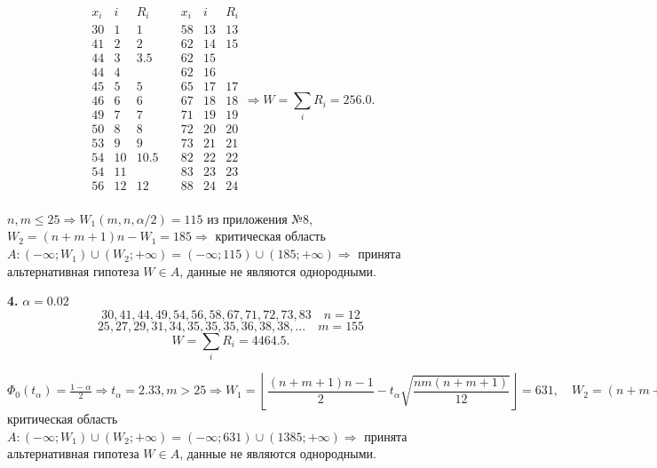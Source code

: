 \documentclass[9pt]{article}
\begin{document}
\[\begin{array}{c|c|c}
    x_i & i & R_i \\ \hline
    30 & 1 & 1\\
    41 & 2 & 2\\
    44 & 3 & 3.5\\
    44 & 4 & \\
    45 & 5 & 5\\
    46 & 6 & 6\\
    49 & 7 & 7\\
    50 & 8 & 8\\
    53 & 9 & 9\\
    54 & 10 & 10.5\\
    54 & 11 & \\
    56 & 12 & 12\\
\end{array}\quad
\begin{array}{c|c|c}
    x_i & i & R_i \\ \hline
    58 & 13 & 13\\
    62 & 14 & 15\\
    62 & 15 & \\
    62 & 16 & \\
    65 & 17 & 17\\
    67 & 18 & 18\\
    71 & 19 & 19\\
    72 & 20 & 20\\
    73 & 21 & 21\\
    82 & 22 & 22\\
    83 & 23 & 23\\
    88 & 24 & 24\\
\end{array}
\Rightarrow W=\displaystyle\sum_i R_i=256.0.\]
\par\(n,m\le25\Rightarrow W_1(m,n,\alpha/2)=115\) из приложения №8, \(W_2=(n+m+1)n-W_1=185\Rightarrow\) критическая область \(A:(-\infty;W_1)\cup(W_2;+\infty)=(-\infty;115)\cup(185;+\infty)\Rightarrow\) принята альтернативная гипотеза \(W\in A\), данные не являются однородными.
\par\textbf{4.} \(\alpha=0.02\)
\[30,41,44,49,54,56,58,67,71,72,73,83\quad n=12\]
\[25,27,29,31,34,35,35,35,36,38,38,...\quad m=155\]
\[W=\displaystyle\sum_i R_i=4464.5.\]
\par\(\Phi_0(t_\alpha)=\frac{1-\alpha}{2}\Rightarrow t_\alpha=2.33, m>25\Rightarrow W_1=\left\lfloor\dfrac{(n+m+1)n-1}{2}-t_\alpha\sqrt{\dfrac{nm(n+m+1)}{12}}\right\rfloor=631, 
\quad W_2=(n+m+1)n-W_1=1385\Rightarrow\) критическая область \(A:(-\infty;W_1)\cup(W_2;+\infty)=(-\infty;631)\cup(1385;+\infty)\Rightarrow\) принята альтернативная гипотеза \(W\in A\), данные не являются однородными.
\end{document}
